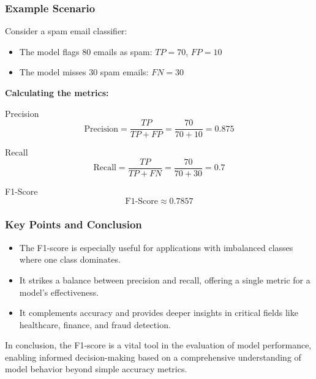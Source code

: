\documentclass[aspectratio=169]{beamer}
\begin{document}
\begin{frame}[fragile]
    \frametitle{Example Scenario}
    Consider a spam email classifier:
    \begin{itemize}
        \item The model flags 80 emails as spam: \( TP = 70 \), \( FP = 10 \)
        \item The model misses 30 spam emails: \( FN = 30 \)
    \end{itemize}
    
    \textbf{Calculating the metrics:}
    
    \begin{block}{Precision}
        \begin{equation}
            \text{Precision} = \frac{TP}{TP + FP} = \frac{70}{70 + 10} = 0.875
        \end{equation}
    \end{block}

    \begin{block}{Recall}
        \begin{equation}
            \text{Recall} = \frac{TP}{TP + FN} = \frac{70}{70 + 30} = 0.7
        \end{equation}
    \end{block}

    \begin{block}{F1-Score}
        \begin{equation}
            \text{F1-Score} \approx 0.7857
        \end{equation}
    \end{block}
\end{frame}

\begin{frame}[fragile]
    \frametitle{Key Points and Conclusion}
    \begin{itemize}
        \item The F1-score is especially useful for applications with imbalanced classes where one class dominates.
        \item It strikes a balance between precision and recall, offering a single metric for a model's effectiveness.
        \item It complements accuracy and provides deeper insights in critical fields like healthcare, finance, and fraud detection.
    \end{itemize}
    
    In conclusion, the F1-score is a vital tool in the evaluation of model performance, enabling informed decision-making based on a comprehensive understanding of model behavior beyond simple accuracy metrics.
\end{frame}
\end{document}
